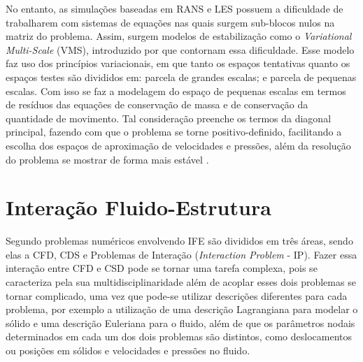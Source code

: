 No entanto, as simulações baseadas em RANS e LES possuem a dificuldade de trabalharem com sistemas de equações nas quais surgem sub-blocos nulos na matriz do problema. Assim, surgem modelos de estabilização como o \textit{Variational Multi-Scale} (VMS), introduzido por  que contornam essa dificuldade. Esse modelo faz uso dos princípios variacionais, em que tanto os espaços tentativas quanto os espaços testes são divididos em: parcela de grandes escalas; e parcela de pequenas escalas. Com isso se faz a modelagem do espaço de pequenas escalas em termos de resíduos das equações de conservação de massa e de conservação da quantidade de movimento. Tal consideração preenche os termos da diagonal principal, fazendo com que o problema se torne positivo-definido, facilitando a escolha dos espaços de aproximação de velocidades e pressões, além da resolução do problema se mostrar de forma mais estável \cite{bazilevs2013computational,sondak2015new}.

\section{Interação Fluido-Estrutura} \label{IFE}

Segundo  problemas numéricos envolvendo IFE são divididos em três áreas, sendo elas a CFD, CDS e Problemas de Interação (\textit{Interaction Problem} - IP). Fazer essa interação entre CFD e CSD pode se tornar uma tarefa complexa, pois se caracteriza pela sua multidisciplinaridade \cite{hou2012numerical} além de acoplar esses dois problemas se tornar complicado, uma vez que pode-se utilizar descrições diferentes para cada problema, por exemplo a utilização de uma descrição Lagrangiana para modelar o sólido e uma descrição Euleriana para o fluido, além de que os parâmetros nodais determinados em cada um dos dois problemas são distintos, como deslocamentos ou posições em sólidos e velocidades e pressões no fluido.

